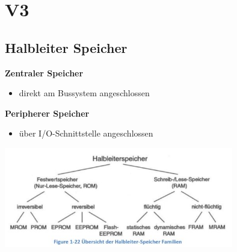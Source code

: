 \section{V3}
\subsection{Halbleiter Speicher}
\begin{multicols}{2}
\textbf{Zentraler Speicher}
\begin{itemize}
    \item direkt am Bussystem angeschlossen
\end{itemize}
\textbf{Peripherer Speicher}
\begin{itemize}
    \item über I/O-Schnittstelle angeschlossen
\end{itemize}

\includegraphics[width=10cm]{images/halbleiterfam}
\end{multicols}

